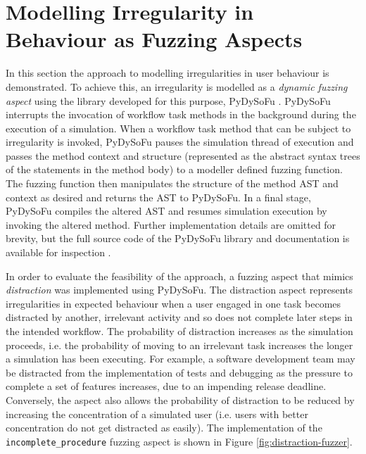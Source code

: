 \documentclass{llncs}
\begin{document}

\section{Modelling Irregularity in Behaviour as Fuzzing Aspects}
\label{sec:fuzzing}


In this section the approach to modelling irregularities in user behaviour is demonstrated.  To achieve this, an irregularity is modelled as a \emph{dynamic
  fuzzing aspect} using the library developed for this purpose, PyDySoFu \cite{storer2016pydysofu-scm}.  PyDySoFu
interrupts the invocation of workflow task methods in the background during the execution of a simulation.  When a
workflow task method that can be subject to irregularity is invoked, PyDySoFu pauses the simulation thread of execution
and passes the method context and structure (represented as the abstract syntax trees of the statements in the method
body) to a modeller defined fuzzing function.  The fuzzing function then manipulates the structure of the method AST and
context as desired and returns the AST to PyDySoFu.  In a final stage, PyDySoFu compiles the altered AST and resumes
simulation execution by invoking the altered method.  Further implementation details are omitted for brevity, but the
full source code of the PyDySoFu library and documentation is available for inspection
\cite{storer2016pydysofu-scm}.

In order to evaluate the feasibility of the approach, a fuzzing aspect that mimics \emph{distraction} was implemented
using PyDySoFu.  The distraction aspect represents irregularities in expected behaviour when a user engaged in one task
becomes distracted by another, irrelevant activity and so does not complete later steps in the intended workflow.  The
probability of distraction increases as the simulation proceeds, i.e. the probability of moving to an irrelevant task
increases the longer a simulation has been executing.  For example, a software development team may be distracted from
the implementation of tests and debugging as the pressure to complete a set of features increases, due to an impending
release deadline.  Conversely, the aspect also allows the probability of distraction to be reduced by increasing the
concentration of a simulated user (i.e. users with better concentration do not get distracted as easily).
The implementation of the \lstinline!incomplete_procedure! fuzzing aspect is shown in Figure
\ref{fig:distraction-fuzzer}.
\end{document}
